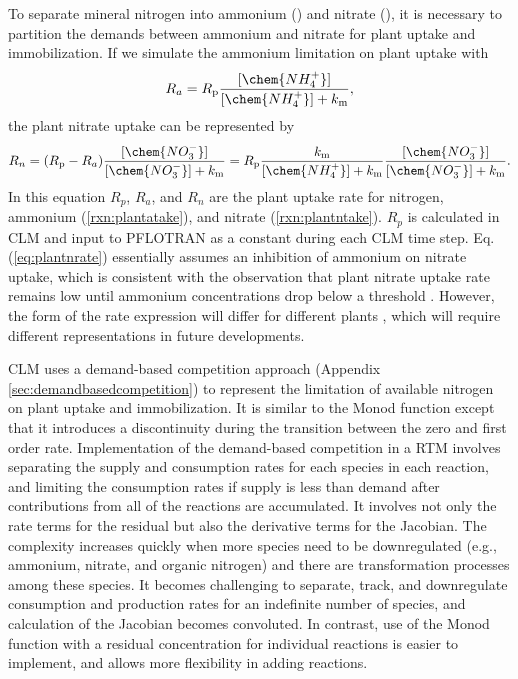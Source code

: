 \documentclass[gmd, manuscript]{copernicus}
\begin{document}
To separate mineral nitrogen into ammonium () and nitrate
(), it is necessary to partition the demands between ammonium and nitrate
for plant uptake and immobilization. If we simulate the ammonium limitation on
plant uptake with 
\begin{equation}
R_a = R_\text{p} \frac{[\chem{NH_4^+}]}{[\chem{NH_4^+}]+k_\text{m}}, 
\label{eq:plantarate}
\end{equation}
the plant nitrate uptake can be represented by 
\begin{equation}
R_n = (R_\text{p} - R_a)\frac{[\chem{NO_3^-}]}{[\chem{NO_3^-}]+k_\text{m}} =
R_\text{p} \frac{k_\text{m}}{[\chem{NH_4^+}]+k_\text{m}}
\frac{[\chem{NO_3^-}]}{[\chem{NO_3^-}]+k_\text{m}}.  
\label{eq:plantnrate}
\end{equation}
In this equation $R_p$, $R_a$, and $R_n$ are the plant uptake rate for nitrogen, ammonium
(\ref{rxn:plantatake}), and nitrate (\ref{rxn:plantntake}).
$R_p$ is calculated in CLM and input to PFLOTRAN as a constant during each CLM
time step. Eq. (\ref{eq:plantnrate}) essentially assumes an inhibition of
ammonium on nitrate uptake, which is consistent with the observation that plant
nitrate uptake rate remains low until ammonium concentrations drop below a
threshold \citep{eltrop1996}.  However, the form of the rate expression will differ for different
plants \citep{Pfautsch2009,Warren2007,Nordin2001,Falkengren1995,Gherardi2013},
which will require different representations in future developments.

CLM uses a demand-based competition approach (Appendix
\ref{sec:demandbasedcompetition}) to represent the limitation of available
nitrogen on plant uptake and immobilization. It is similar to the Monod
function except that it introduces a discontinuity during the transition
between the zero and first order rate. Implementation of the demand-based
competition in a RTM involves separating the supply and consumption rates for
each species in each reaction, and limiting the consumption rates if supply is less than demand
after contributions from all of the reactions are accumulated. It involves not
only the rate terms for the residual but also the derivative terms for the
Jacobian. The complexity increases quickly when more species need to be
downregulated (e.g., ammonium, nitrate, and organic nitrogen) and there are
transformation processes among these species. It becomes challenging to
separate, track, and downregulate consumption and production rates for an
indefinite number of species, and calculation of the Jacobian becomes
convoluted. In contrast, use of the Monod function with a residual concentration
for individual reactions is easier to implement, and allows more flexibility in
adding reactions.
\end{document}
